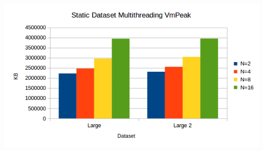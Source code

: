 \documentclass[12pt]{article}
\begin{document}
\includegraphics[scale=0.5]{DynamicStaticMultithreading_VmPeak.png}
\end{document}
